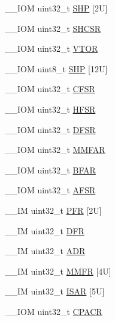 \begin{DoxyCompactItemize}
\item 
\-\_\-\-\_\-\-I\-O\-M uint32\-\_\-t \hyperlink{struct_s_c_b___type_a5c40d124f95a3f7f431a3d5409d6ad28}{S\-H\-P} \mbox{[}2\-U\mbox{]}
\item 
\-\_\-\-\_\-\-I\-O\-M uint32\-\_\-t \hyperlink{struct_s_c_b___type_a7b5ae9741a99808043394c4743b635c4}{S\-H\-C\-S\-R}
\item 
\-\_\-\-\_\-\-I\-O\-M uint32\-\_\-t \hyperlink{struct_s_c_b___type_a187a4578e920544ed967f98020fb8170}{V\-T\-O\-R}
\item 
\-\_\-\-\_\-\-I\-O\-M uint8\-\_\-t \hyperlink{struct_s_c_b___type_a9b05f74580fc93daa7fe2f0e1c9c5663}{S\-H\-P} \mbox{[}12\-U\mbox{]}
\item 
\-\_\-\-\_\-\-I\-O\-M uint32\-\_\-t \hyperlink{struct_s_c_b___type_a0cda9e061b42373383418663092ad19a}{C\-F\-S\-R}
\item 
\-\_\-\-\_\-\-I\-O\-M uint32\-\_\-t \hyperlink{struct_s_c_b___type_a14ad254659362b9752c69afe3fd80934}{H\-F\-S\-R}
\item 
\-\_\-\-\_\-\-I\-O\-M uint32\-\_\-t \hyperlink{struct_s_c_b___type_a191579bde0d21ff51d30a714fd887033}{D\-F\-S\-R}
\item 
\-\_\-\-\_\-\-I\-O\-M uint32\-\_\-t \hyperlink{struct_s_c_b___type_a2d03d0b7cec2254f39eb1c46c7445e80}{M\-M\-F\-A\-R}
\item 
\-\_\-\-\_\-\-I\-O\-M uint32\-\_\-t \hyperlink{struct_s_c_b___type_a3f8e7e58be4e41c88dfa78f54589271c}{B\-F\-A\-R}
\item 
\-\_\-\-\_\-\-I\-O\-M uint32\-\_\-t \hyperlink{struct_s_c_b___type_ab65372404ce64b0f0b35e2709429404e}{A\-F\-S\-R}
\item 
\-\_\-\-\_\-\-I\-M uint32\-\_\-t \hyperlink{struct_s_c_b___type_a40745bb0af880c45827a653222d54117}{P\-F\-R} \mbox{[}2\-U\mbox{]}
\item 
\-\_\-\-\_\-\-I\-M uint32\-\_\-t \hyperlink{struct_s_c_b___type_a85dd6fe77aab17e7ea89a52c59da6004}{D\-F\-R}
\item 
\-\_\-\-\_\-\-I\-M uint32\-\_\-t \hyperlink{struct_s_c_b___type_af084e1b2dad004a88668efea1dfe7fa1}{A\-D\-R}
\item 
\-\_\-\-\_\-\-I\-M uint32\-\_\-t \hyperlink{struct_s_c_b___type_a4f353f207bb27a1cea7861aa9eb00dbb}{M\-M\-F\-R} \mbox{[}4\-U\mbox{]}
\item 
\-\_\-\-\_\-\-I\-M uint32\-\_\-t \hyperlink{struct_s_c_b___type_a00e93446b3433a807f1574fa2f1fce54}{I\-S\-A\-R} \mbox{[}5\-U\mbox{]}
\item 
\-\_\-\-\_\-\-I\-O\-M uint32\-\_\-t \hyperlink{struct_s_c_b___type_ac6a860c1b8d8154a1f00d99d23b67764}{C\-P\-A\-C\-R}

\end{DoxyCompactItemize}
